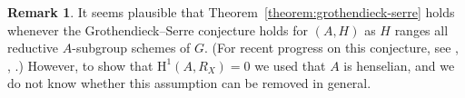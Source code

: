 \documentclass[11pt,reqno]{amsart}
\theoremstyle{definition}
\newtheorem{remark}[theorem]{Remark}
\renewcommand{\rm}{\mathrm}
\begin{document}
\begin{remark}
It seems plausible that Theorem~\ref{theorem:grothendieck-serre} holds whenever the Grothendieck--Serre conjecture holds for $(A, H)$ as $H$ ranges all reductive $A$-subgroup schemes of $G$. (For recent progress on this conjecture, see \cite{Fedorov-Panin}, \cite{Panin}, \cite{Cesnavicius}.) However, to show that $\rm{H}^1(A, R_X) = 0$ we used that $A$ is henselian, and we do not know whether this assumption can be removed in general.
\end{remark}















































\end{document}
